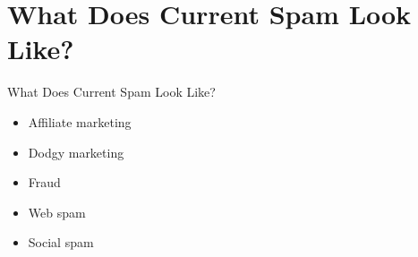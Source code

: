 \documentclass[nobackground,dvipsnames,table,aspectratio=169]{beamer}
\begin{document}
\section{What Does Current Spam Look Like?}

\begin{frame}{What Does Current Spam Look Like?}
    \begin{itemize}
        \item Affiliate marketing
        \item Dodgy marketing
        \item Fraud
        \item Web spam
        \item Social spam
    \end{itemize}
\end{frame}
\end{document}
